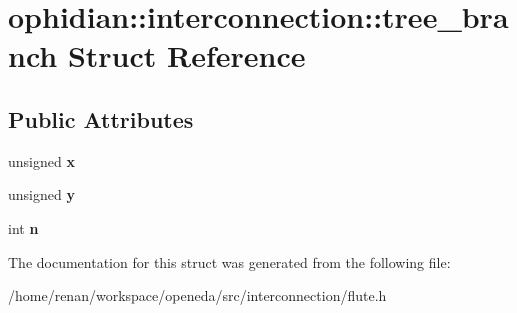 \hypertarget{structophidian_1_1interconnection_1_1tree__branch}{\section{ophidian\-:\-:interconnection\-:\-:tree\-\_\-branch Struct Reference}
\label{structophidian_1_1interconnection_1_1tree__branch}
}
\subsection*{Public Attributes}
\begin{DoxyCompactItemize}
\item 
\hypertarget{structophidian_1_1interconnection_1_1tree__branch_aac80dc47681f83c1a9aeacd5e2ab46a1}{unsigned {\bfseries x}}\label{structophidian_1_1interconnection_1_1tree__branch_aac80dc47681f83c1a9aeacd5e2ab46a1}

\item 
\hypertarget{structophidian_1_1interconnection_1_1tree__branch_a8aeab81888cd0631494c680865a90c82}{unsigned {\bfseries y}}\label{structophidian_1_1interconnection_1_1tree__branch_a8aeab81888cd0631494c680865a90c82}

\item 
\hypertarget{structophidian_1_1interconnection_1_1tree__branch_a9f80eef468ec3a62f1d21af20e8d5b99}{int {\bfseries n}}\label{structophidian_1_1interconnection_1_1tree__branch_a9f80eef468ec3a62f1d21af20e8d5b99}

\end{DoxyCompactItemize}


The documentation for this struct was generated from the following file\-:\begin{DoxyCompactItemize}
\item 
/home/renan/workspace/openeda/src/interconnection/flute.\-h\end{DoxyCompactItemize}
